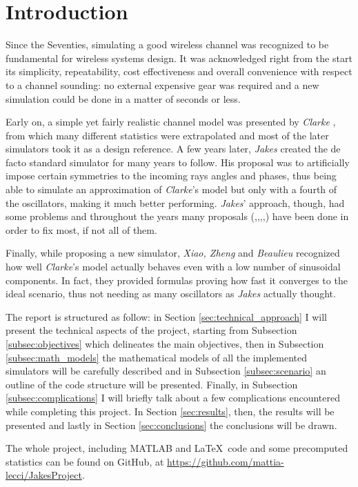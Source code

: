 \section{Introduction} %
\label{sec:introduction}

Since the Seventies, simulating a good wireless channel was recognized to be fundamental for wireless systems design. It was acknowledged right from the start its simplicity, repeatability, cost effectiveness and overall convenience with respect to a channel sounding: no external expensive gear was required and a new simulation could be done in a matter of seconds or less.

Early on, a simple yet fairly realistic channel model was presented by \textit{Clarke} \cite{clarke}, from which many different statistics were extrapolated and most of the later simulators took it as a design reference. A few years later, \textit{Jakes} created the de facto standard simulator \cite{jakes} for many years to follow. His proposal was to artificially impose certain symmetries to the incoming rays angles and phases, thus being able to simulate an approximation of \textit{Clarke}'s model but only with a fourth of the oscillators, making it much better performing. \textit{Jakes}' approach, though, had some problems and throughout the years many proposals (\cite{A1},\cite{A2},\cite{A3},\cite{C1},\cite{C2}) have been done in order to fix most, if not all of them.

Finally, while proposing a new simulator, \textit{Xiao, Zheng} and \textit{Beaulieu} \cite{B1} recognized how well \textit{Clarke}'s model actually behaves even with a low number of sinusoidal components. In fact, they provided formulas proving how fast it converges to the ideal scenario, thus not needing as many oscillators as \textit{Jakes} actually thought.

The report is structured as follow: in Section \ref{sec:technical_approach} I will present the technical aspects of the project, starting from Subsection \ref{subsec:objectives} which delineates the main objectives, then in Subsection \ref{subsec:math_models} the mathematical models of all the implemented simulators will be carefully described and in Subsection \ref{subsec:scenario} an outline of the code structure will be presented. Finally, in Subsection \ref{subsec:complications} I will briefly talk about a few complications encountered while completing this project. In Section \ref{sec:results}, then, the results will be presented and lastly in Section \ref{sec:conclusions} the conclusions will be drawn.

The whole project, including MATLAB and \LaTeX \ code and some precomputed statistics can be found on GitHub, at \url{https://github.com/mattia-lecci/JakesProject}.